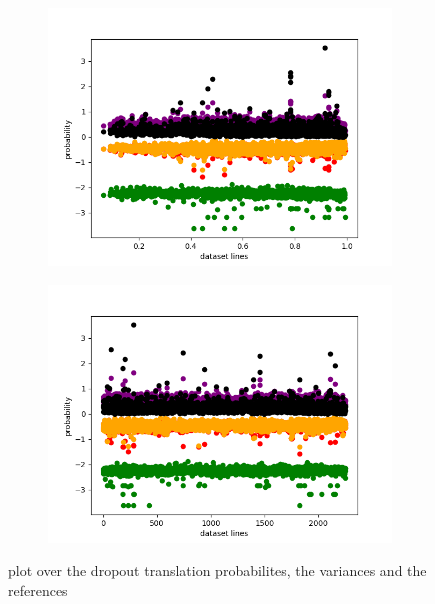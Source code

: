\begin{figure}[ht]
    \centering%
    \begin{subfigure}{0.4\linewidth}
    \includegraphics[width=\textwidth]{Latex/sections/images/seamlessscoresoverref.png}
    \end{subfigure}
    \begin{subfigure}{0.4\linewidth}
    \includegraphics[width=\linewidth]{Latex/sections/images/seamlessscores.png}
    \end{subfigure}
    
    \caption{plot over the dropout translation probabilites, the variances and the references}
    \label{fig:dropout scatter plot}
\end{figure}

